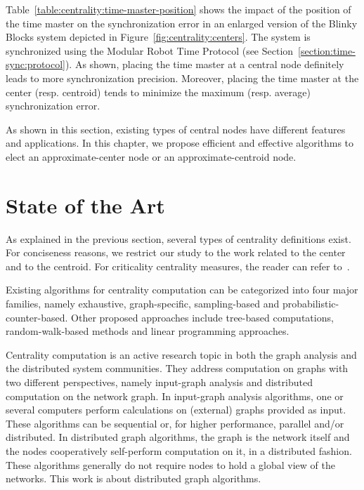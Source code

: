 Table~\ref{table:centrality:time-master-position} shows the impact of the position of the time master on the synchronization error in an enlarged version of the Blinky Blocks system depicted in Figure~\ref{fig:centrality:centers}. The system is synchronized using the Modular Robot Time Protocol (see Section~\ref{section:time-sync:protocol}). As shown, placing the time master at a central node definitely leads to more synchronization precision. Moreover, placing the time master at the center (resp. centroid) tends to minimize the maximum (resp. average) synchronization error.

As shown in this section, existing types of central nodes have different features and applications. In this chapter, we propose efficient and effective algorithms to elect an approximate-center node or an approximate-centroid node.

\section{State of the Art}
\label{section:centrality:related-work}

As explained in the previous section, several types of centrality definitions exist. For conciseness reasons, we 
restrict our study to the work related to the center and to the centroid. For criticality centrality measures, the reader can refer to~\cite{nanda2008localized,tizghadam2010betweenness,kermarrec2011second,kang2011centralities}.

Existing algorithms for centrality computation can be categorized into four major families, namely exhaustive, graph-specific, sampling-based and probabilistic-counter-based. Other proposed approaches include tree-based computations, random-walk-based methods and linear programming approaches.

Centrality computation is an active research topic in both the graph analysis and the distributed system communities. They address computation on graphs with two different perspectives, namely input-graph analysis and distributed computation on the network graph. In input-graph analysis algorithms, one or several computers perform calculations on (external) graphs provided as input. These algorithms can be sequential or, for higher performance, parallel and/or distributed. In distributed graph algorithms, the graph is the network itself and the nodes cooperatively self-perform computation on it, in a distributed fashion. These algorithms generally do not require nodes to hold a global view of the networks. This work is about distributed graph algorithms.

